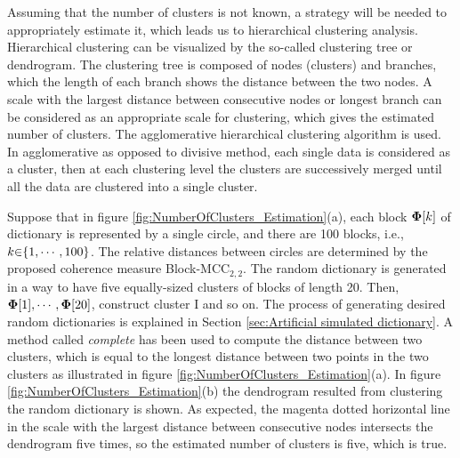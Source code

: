 
Assuming that the number of clusters is not known, a strategy will be needed to appropriately estimate it, which leads us to hierarchical clustering analysis.
Hierarchical clustering 
can be visualized by the so-called clustering tree or dendrogram.
The clustering tree is composed of nodes (clusters) and branches, which the length of each branch shows the distance between the two nodes.
A scale with the largest distance between consecutive nodes or longest branch can be considered as an appropriate scale for clustering, which gives the estimated number of clusters.
The agglomerative hierarchical clustering algorithm is used. 
In 
agglomerative as opposed to 
divisive method, each single data is considered as a cluster, then at each clustering level the clusters are successively merged until all the data are clustered into a single cluster.

Suppose that in figure \ref{fig:NumberOfClusters_Estimation}(a), each block $\boldsymbol{\Phi} [k]$ of dictionary is represented by a single circle, and there are 100 blocks, i.e., $k {\in} \{ 1 , \cdots , 100 \}$.
The relative distances between circles are determined by the proposed coherence measure Block-MCC$_{2,2}$.
The random dictionary is generated in a way to have five equally-sized clusters of blocks of length 20.
Then, $\boldsymbol{\Phi} [1] , \cdots , \boldsymbol{\Phi} [20]$, construct cluster I and so on.
The process of generating desired random dictionaries is explained in Section \ref{sec:Artificial simulated dictionary}.
A method called \emph{complete} has been used to compute the distance between two clusters, which is equal to the longest distance between two points in the two clusters as illustrated in figure \ref{fig:NumberOfClusters_Estimation}(a).
In figure \ref{fig:NumberOfClusters_Estimation}(b) the dendrogram resulted from clustering the random dictionary is shown.
As expected, the magenta dotted horizontal line in the scale with the largest distance between consecutive nodes intersects the dendrogram five times, so the estimated number of clusters is five, which is true.

\FloatBarrier
